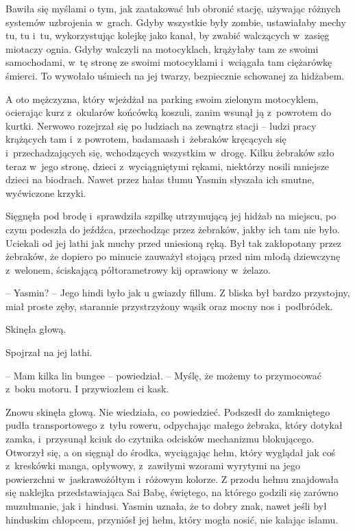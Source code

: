 \documentclass[oneside,polish,11pt,rmheadings]{mwbk}
\begin{document}
Bawiła się myślami o tym, jak zaatakować lub obronić stację, używając różnych systemów uzbrojenia w~grach. Gdyby wszystkie były zombie, ustawiałaby mechy tu, tu i~tu, wykorzystując kolejkę jako kanał, by zwabić walczących w~zasięg miotaczy ognia. Gdyby walczyli na motocyklach, krążyłaby tam ze swoimi samochodami, w~tę stronę ze swoimi motocyklami i~wciągała tam ciężarówkę śmierci. To wywołało uśmiech na jej twarzy, bezpiecznie schowanej za hidżabem.

A oto mężczyzna, który wjeżdżał na parking swoim zielonym motocyklem, ocierając kurz z~okularów końcówką koszuli, zanim wsunął ją z~powrotem do kurtki. Nerwowo rozejrzał się po ludziach na zewnątrz stacji -- ludzi pracy krążących tam i~z powrotem, badamaash i~żebraków kręcących się i~przechadzających się, wchodzących wszystkim w~drogę. Kilku żebraków szło teraz w~jego stronę, dzieci z~wyciągniętymi rękami, niektórzy nosili mniejsze dzieci na biodrach. Nawet przez hałas tłumu Yasmin słyszała ich smutne, wyćwiczone krzyki.

Sięgnęła pod brodę i~sprawdziła szpilkę utrzymującą jej hidżab na miejscu, po czym podeszła do jeźdźca, przechodząc przez żebraków, jakby ich tam nie było. Uciekali od jej lathi jak muchy przed uniesioną ręką. Był tak zakłopotany przez żebraków, że dopiero po minucie zauważył stojącą przed nim młodą dziewczynę z~welonem, ściskającą półtorametrowy kij oprawiony w~żelazo.

-- Yasmin? -- Jego hindi było jak u gwiazdy fillum. Z bliska był bardzo przystojny, miał proste zęby, starannie przystrzyżony wąsik oraz mocny nos i~podbródek.

Skinęła głową.

Spojrzał na jej lathi. 

-- Mam kilka lin bungee -- powiedział. -- Myślę, że możemy to przymocować z~boku motoru. I przywiozłem ci kask.

Znowu skinęła głową. Nie wiedziała, co powiedzieć. Podszedł do zamkniętego pudła transportowego z~tyłu roweru, odpychając małego żebraka, który dotykał zamka, i~przysunął kciuk do czytnika odcisków mechanizmu blokującego. Otworzył się, a on sięgnął do środka, wyciągając hełm, który wyglądał jak coś z~kreskówki manga, opływowy, z~zawiłymi wzorami wyrytymi na jego powierzchni w~jaskrawożółtym i~różowym kolorze. Z przodu hełmu znajdowała się naklejka przedstawiająca Sai Babę, świętego, na którego godzili się zarówno muzułmanie, jak i~hindusi. Yasmin uznała, że to dobry znak, nawet jeśli był hinduskim chłopcem, przyniósł jej hełm, który mogła nosić, nie kalając islamu.
\end{document}
